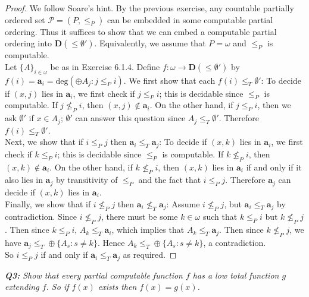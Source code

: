 \documentclass{article}
\begin{document}
  \begin{proof}
    We follow Soare's hint. By the previous exercise, any countable
    partially ordered set $\mathcal{P}=(P,\leq_P)$ can be embedded in some
    computable partial ordering. Thus it suffices to show that we can embed
    a computable partial ordering into $\bm{D}(\leq\emptyset')$.
    Equivalently, we assume that $P=\omega$ and $\leq_P$ is computable. \\

    Let $\{A\}_{i\in\omega}$ be as in Exercise 6.1.4. Define
    $f:\omega\rightarrow \bm{D}(\leq\emptyset')$ by
    $f(i)=\bm{a}_i=\text{deg}(\oplus A_j:j\leq_P i)$. We first show that
    each $f(i)\leq_T\emptyset'$: To decide if $(x,j)$ lies in $\bm{a}_i$,
    we first check if $j\leq_P i$; this is decidable since $\leq_P$ is
    computable. If $j\not\leq_P i$, then $(x,j)\not\in\bm{a}_i$. On the
    other hand, if $j\leq_P i$, then we ask $\emptyset'$ if $x\in A_j$;
    $\emptyset'$ can answer this question since $A_j\leq_T\emptyset'$.
    Therefore $f(i)\leq_T\emptyset'$. \\

    Next, we show that if $i\leq_P j$ then $\bm{a}_i\leq_T\bm{a}_j$: To
    decide if $(x,k)$ lies in $\bm{a}_i$, we first check if $k\leq_P i$;
    this is decidable since $\leq_P$ is computable. If $k\not\leq_P i$,
    then $(x,k)\not\in\bm{a}_i$. On the other hand, if $k\not\leq_P i$,
    then $(x,k)$ lies in $\bm{a}_i$ if and only if it also lies in
    $\bm{a}_j$ by transitivity of $\leq_P$ and the fact that $i\leq_P j$.
    Therefore $\bm{a}_j$ can decide if $(x,k)$ lies in $\bm{a}_i$. \\

    Finally, we show that if $i\not\leq_P j$ then
    $\bm{a}_i\not\leq_T\bm{a}_j$: Assume $i\not\leq_P j$, but
    $\bm{a}_i\leq_T\bm{a}_j$ by contradiction. Since $i\not\leq_P j$, there
    must be some $k\in\omega$ such that $k\leq_P i$ but $k\not\leq_P j$.
    Then since $k\leq_P i$, $A_k\leq_T\bm{a}_i$, which implies that
    $A_k\leq_T\bm{a}_j$. Then since $k\not\leq_P j$, we have $\bm{a}_j\leq_T
    \oplus\{A_s:s\neq k\}$. Hence $A_k\leq_T \oplus\{A_s:s\neq k\}$,
    a contradiction. \\

    So $i\leq_P j$ if and only if $\bm{a}_i\leq_T\bm{a}_j$ as required.
  \end{proof}

\it \textbf{Q3:} Show that every partial computable function $f$ has a low
  total function $g$ extending $f$. So if $f(x)$ exists then $f(x)=g(x)$.
\end{document}
